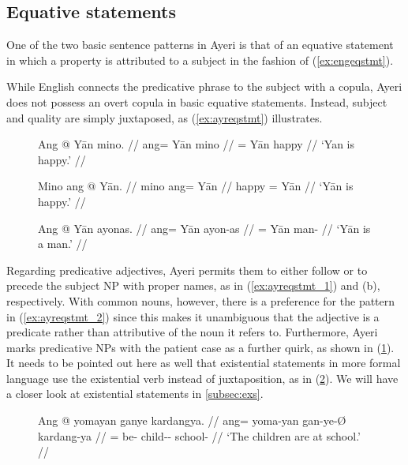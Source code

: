 \subsection{Equative statements}
\label{subsec:eqs}

One of the two basic sentence patterns in Ayeri is that of an equative
statement in which a property is attributed to a subject in the fashion of 
(\ref{ex:engeqstmt}).

\pex\label{ex:engeqstmt}
\a\label{ex:engeqstmt_1} 
\a\label{ex:engeqstmt_2} 
\a\label{ex:engeqstmt_3} 
\xe

While English connects the predicative phrase to the subject with a copula,
Ayeri does not possess an overt copula in basic equative statements. Instead,
subject and quality are simply juxtaposed, as (\ref{ex:ayreqstmt}) illustrates.

\begin{figure}[h]
\pex\label{ex:ayreqstmt}
\a\label{ex:ayreqstmt_1}\begingl
	\gla Ang @ Yān mino. //
	\glb ang= Yān mino //
	\glc \Aarg{}= Yān happy //
	\glft `Yan is happy.' //
\endgl

\a\label{ex:ayreqstmt_2}\begingl
	\gla Mino ang @ Yān. //
	\glb mino ang= Yān //
	\glc happy \Aarg{}= Yān //
	\glft `Yān is happy.' //
\endgl

\a\label{ex:ayreqstmt_3}\begingl
	\gla Ang @ Yān ayonas. //
	\glb ang= Yān ayon-as //
	\glc \Aarg{}= Yān man-\Parg{} //
	\glft `Yān is a man.' //
\endgl
\xe
\end{figure}

Regarding predicative adjectives, Ayeri permits them to either follow or to
precede the subject NP with proper names, as in (\ref{ex:ayreqstmt_1}) and (b),
respectively. With common nouns, however, there is a preference for the pattern
in (\ref{ex:ayreqstmt_2}) since this makes it unambiguous that the adjective is
a predicate rather than attributive of the noun it refers to. Furthermore,
Ayeri marks predicative NPs with the patient case as a further quirk, as shown
in (\ref{ex:ayreqstmt_3}). It needs to be pointed out here as well that
existential statements in more formal language use the existential verb
 instead of juxtaposition, as in 
(\ref{ex:ayrexstmt}). We will have a closer look at existential statements in
\autoref{subsec:exs}.

\begin{figure}[h]
\ex\label{ex:ayrexstmt}\begingl
	\gla Ang @ yomayan ganye kardangya. //
	\glb ang= yoma-yan gan-ye-Ø kardang-ya //
	\glc \AgtT{}= be-\TplM{} child-\Pl{}-\Top{} school-\Loc{} //
	\glft `The children are at school.' //
\endgl\xe
\end{figure}

